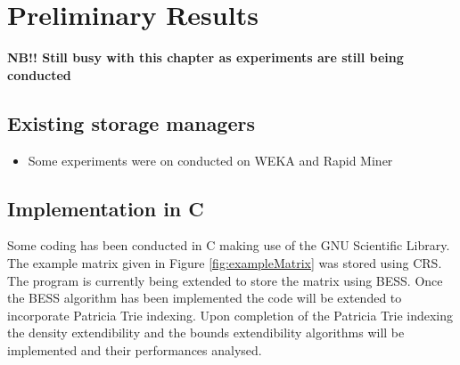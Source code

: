 %
%
%
%
%
\chapter{Preliminary Results} \label{chap:preliminaryresults}
\vspace{-1cm}

\textbf{NB!! Still busy with this chapter as experiments are still being conducted}
\section{Existing storage managers}
\begin{itemize}
	\item Some experiments were on conducted on WEKA and Rapid Miner
\end{itemize}


\section{Implementation in C}
Some coding has been conducted in C making use of the GNU Scientific Library. The example matrix given in Figure \ref{fig:exampleMatrix} was stored using CRS. The program is currently being extended to store the matrix using BESS. Once the BESS algorithm has been implemented the code will be extended to incorporate Patricia Trie indexing. Upon completion of the Patricia Trie indexing the density extendibility and the bounds extendibility algorithms will be implemented and their performances analysed.